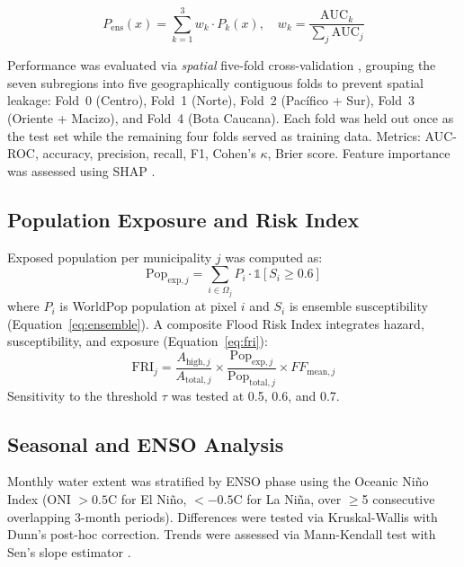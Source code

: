 \documentclass{article}
\begin{document}
\begin{equation}
    P_{\text{ens}}(x) = \sum_{k=1}^{3} w_k \cdot P_k(x), \quad w_k = \frac{\text{AUC}_k}{\sum_{j} \text{AUC}_j}
    \label{eq:ensemble}
\end{equation}

Performance was evaluated via \textit{spatial} five-fold cross-validation \citep{Roberts2017}, grouping the seven subregions into five geographically contiguous folds to prevent spatial leakage: Fold~0 (Centro), Fold~1 (Norte), Fold~2 (Pac\'ifico + Sur), Fold~3 (Oriente + Macizo), and Fold~4 (Bota Caucana). Each fold was held out once as the test set while the remaining four folds served as training data. Metrics: AUC-ROC, accuracy, precision, recall, F1, Cohen's $\kappa$, Brier score. Feature importance was assessed using SHAP \citep{Lundberg2017}.

\subsection{Population Exposure and Risk Index}

Exposed population per municipality $j$ was computed as:
\begin{equation}
    \text{Pop}_{\text{exp},j} = \sum_{i \in \Omega_j} P_i \cdot \mathbb{1}[S_i \geq 0.6]
    \label{eq:pop_exposure}
\end{equation}
where $P_i$ is WorldPop population at pixel $i$ and $S_i$ is ensemble susceptibility (Equation~\ref{eq:ensemble}). A composite Flood Risk Index integrates hazard, susceptibility, and exposure (Equation~\ref{eq:fri}):
\begin{equation}
    \text{FRI}_j = \frac{A_{\text{high},j}}{A_{\text{total},j}} \times \frac{\text{Pop}_{\text{exp},j}}{\text{Pop}_{\text{total},j}} \times FF_{\text{mean},j}
    \label{eq:fri}
\end{equation}
Sensitivity to the threshold $\tau$ was tested at 0.5, 0.6, and 0.7.

\subsection{Seasonal and ENSO Analysis}

Monthly water extent was stratified by ENSO phase using the Oceanic Ni\~no Index (ONI $> 0.5$\textdegree{}C for El Ni\~no, $< -0.5$\textdegree{}C for La Ni\~na, over $\geq$5 consecutive overlapping 3-month periods). Differences were tested via Kruskal-Wallis with Dunn's post-hoc correction. Trends were assessed via Mann-Kendall test \citep{Mann1945} with Sen's slope estimator \citep{Sen1968}.
\end{document}
